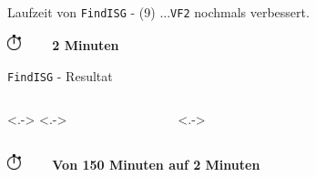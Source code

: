 \begin{frame}[<+->]{Laufzeit von \texttt{FindISG} - (9)}{}
  {\beamerblue ...\texttt{VF2} nochmals verbessert.\newline}
  \begin{figure}
    \centering
    
  \end{figure}
  \begin{center}
    \includegraphics[width=0.4cm]{stop-watch-icon.png} \bf ~~~ 2 Minuten
  \end{center}
\end{frame}

\begin{frame}[<+->]{\texttt{FindISG} - Resultat}{}
  \begin{columns}<.->
    <.->
      \begin{figure}
        \centering
        
      \end{figure}
    <.->
      \begin{figure}
        \centering
        
      \end{figure}
  \end{columns}
  \begin{center}
    \includegraphics[width=0.4cm]{stop-watch-icon.png} \bf ~~~ Von 150 Minuten auf 2 Minuten
  \end{center}
\end{frame}
